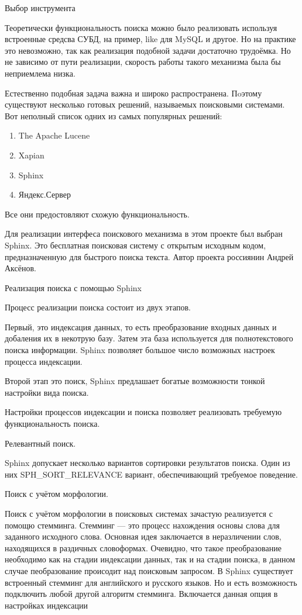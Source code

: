 
Выбор инструмента


Теоретически функциональность поиска можно было реализовать используя
встроенные средсва СУБД, на пример, like для MySQL и другое.
Но на практике это невозможно, так как реализация подобной задачи 
достаточно трудоёмка.
Но не зависимо от пути реализации, скорость работы такого механизма была бы неприемлема низка.

Естественно подобная задача важна и широко распространена.
Пoэтому существуют несколько готовых решений, называемых поисковыми системами.
Вот неполный список одних из самых популярных решений:
\begin{enumerate}
    \item The Apache Lucene 
    \item Xapian
    \item Sphinx
    \item Яндекс.Сервер
\end{enumerate}

Все они предостовляют схожую функциональность.

Для реализации интерфеса поискового механизма в этом проекте был выбран Sphinx. 
Это бесплатная поисковая систему с открытым исходным кодом, 
предназначенную для быстрого поиска текста. 
Автор проекта россиянин Андрей Аксёнов.


Реализация поиска с помощью Sphinx

Процесс реализации поиска состоит из двух этапов.

Первый, это индексация данных, то есть преобразование входных данных и добаления их в некотрую базу.
Затем эта база используется для полнотекстового поиска информации.
Sphinx позволяет большое число возможных настроек процесса индексации.

Второй этап это поиск, Sphinx предлашает богатые возможности тонкой настройки вида поиска.

Настройки процессов индексации и поиска позволяет реализовать требуемую функциональность поиска.


Релевантный поиск.

Sphinx допускает несколько вариантов сортировки результатов поиска.
Один из них SPH\_SORT\_RELEVANCE вариант, обеспечивающий требуемое поведение.

Поиск с учётом морфологии.

Поиск с учётом морфологии в поисковых системах зачастую реализуется с помощю стемминга. Стемминг --- это процесс нахождения основы слова для заданного исходного слова.
Основная идея заключается в неразличении слов, находящихся в раздичных словоформах.
Очевидно, что такое преобразование необходимо как на стадии индексации данных, так и на стадии поиска, в данном случае пеобразование происодит над поисковым запросом.
В Sphinx существует встроенный стемминг для английского и русского языков.
Но и есть возможность подключить любой другой алгоритм стемминга.
Включается данная опция в настройках индексации 


